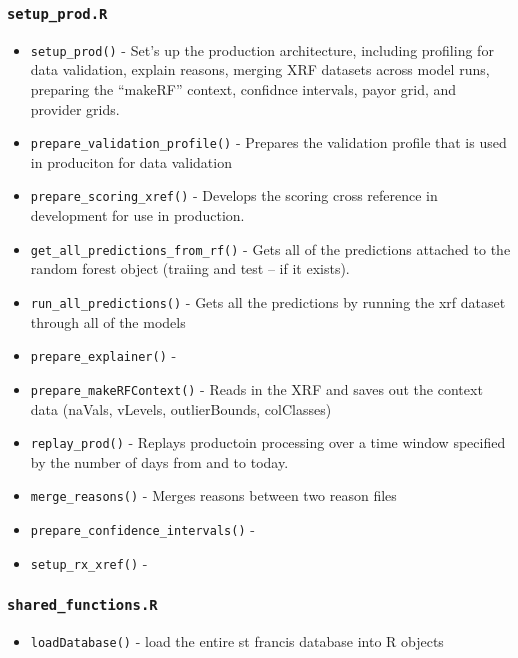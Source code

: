 \documentclass[
]{book}
\providecommand{\tightlist}{%
  \setlength{\itemsep}{0pt}\setlength{\parskip}{0pt}}
\begin{document}
\hypertarget{setup_prod.r-1}{%
\subsubsection{\texorpdfstring{\texttt{setup\_prod.R}}{setup\_prod.R}}\label{setup_prod.r-1}}

\begin{itemize}
\tightlist
\item
  \texttt{setup\_prod()} - Set's up the production architecture, including profiling for data validation, explain reasons, merging XRF datasets across model runs, preparing the ``makeRF'' context, confidnce intervals, payor grid, and provider grids.
\item
  \texttt{prepare\_validation\_profile()} - Prepares the validation profile that is used in produciton for data validation
\item
  \texttt{prepare\_scoring\_xref()} - Develops the scoring cross reference in development for use in production.
\item
  \texttt{get\_all\_predictions\_from\_rf()} - Gets all of the predictions attached to the random forest object (traiing and test -- if it exists).
\item
  \texttt{run\_all\_predictions()} - Gets all the predictions by running the xrf dataset through all of the models
\item
  \texttt{prepare\_explainer()} -
\item
  \texttt{prepare\_makeRFContext()} - Reads in the XRF and saves out the context data (naVals, vLevels, outlierBounds, colClasses)
\item
  \texttt{replay\_prod()} - Replays productoin processing over a time window specified by the number of days from and to today.
\item
  \texttt{merge\_reasons()} - Merges reasons between two reason files
\item
  \texttt{prepare\_confidence\_intervals()} -
\item
  \texttt{setup\_rx\_xref()} -
\end{itemize}

\hypertarget{shared_functions.r}{%
\subsubsection{\texorpdfstring{\texttt{shared\_functions.R}}{shared\_functions.R}}\label{shared_functions.r}}

\begin{itemize}
\tightlist
\item
  \texttt{loadDatabase()} - load the entire st francis database into R objects
\end{itemize}
\end{document}
